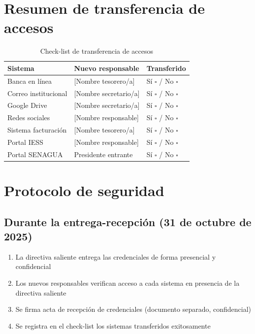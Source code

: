 \section*{Resumen de transferencia de accesos}

\begin{table}[H]
\centering
\caption{Check-list de transferencia de accesos}
\label{tab:checklist-accesos}
\begin{tabularx}{\textwidth}{@{}lXl@{}}
\toprule
\textbf{Sistema} & \textbf{Nuevo responsable} & \textbf{Transferido} \\
\midrule
Banca en línea & [Nombre tesorero/a] & Sí $\square$ / No $\square$ \\
Correo institucional & [Nombre secretario/a] & Sí $\square$ / No $\square$ \\
Google Drive & [Nombre secretario/a] & Sí $\square$ / No $\square$ \\
Redes sociales & [Nombre responsable] & Sí $\square$ / No $\square$ \\
Sistema facturación & [Nombre tesorero/a] & Sí $\square$ / No $\square$ \\
Portal IESS & [Nombre responsable] & Sí $\square$ / No $\square$ \\
Portal SENAGUA & Presidente entrante & Sí $\square$ / No $\square$ \\
\bottomrule
\end{tabularx}
\end{table}

\section*{Protocolo de seguridad}

\subsection*{Durante la entrega-recepción (31 de octubre de 2025)}

\begin{enumerate}
  \item La directiva saliente entrega las credenciales de forma presencial y confidencial
  \item Los nuevos responsables verifican acceso a cada sistema en presencia de la directiva saliente
  \item Se firma acta de recepción de credenciales (documento separado, confidencial)
  \item Se registra en el check-list los sistemas transferidos exitosamente
\end{enumerate}

